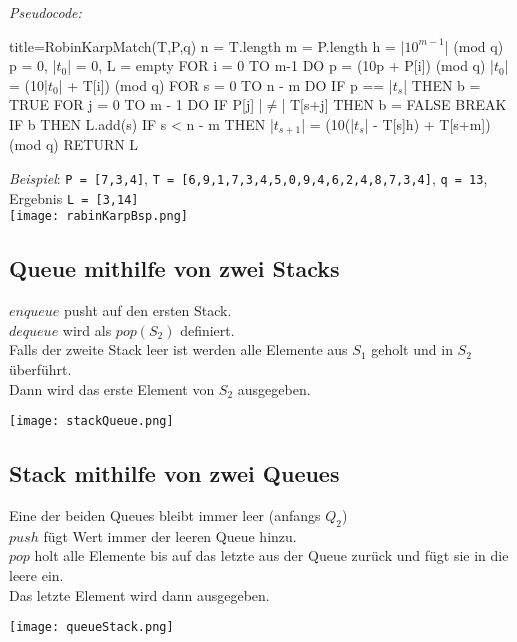             \textit{Pseudocode:}
            \begin{ccode}[autogobble,escapeinside=||]{title={RobinKarpMatch(T,P,q)}}
            n = T.length
            m = P.length
            h = |$10^{m-1}$| (mod q)
            p = 0, |$t_0$| = 0, L = empty
            FOR i = 0 TO m-1 DO
                p = (10p + P[i]) (mod q)
                |$t_0$| = (10|$t_0$| + T[i]) (mod q)
            FOR s = 0 TO n - m DO
                IF p == |$t_s$| THEN
                    b = TRUE
                    FOR j = 0 TO m - 1 DO
                        IF P[j] |$\neq$| T[s+j] THEN
                            b = FALSE
                            BREAK
                    IF b THEN
                        L.add(s)
                IF s < n - m THEN
                |$t_{s+1}$| = (10(|$t_s$| - T[s]h) + T[s+m]) (mod q)
            RETURN L
            \end{ccode}

            \noindent
            \textit{Beispiel}: \texttt{P = [7,3,4]}, \texttt{T = [6,9,1,7,3,4,5,0,9,4,6,2,4,8,7,3,4]}, \texttt{q = 13}, Ergebnis \texttt{L = [3,14]} \\
            \texttt{[image: rabinKarpBsp.png]}




    \subsection{Queue mithilfe von zwei Stacks}

        $enqueue$ pusht auf den ersten Stack. \\
        $dequeue$ wird als $pop(S_2)$ definiert. \\
        Falls der zweite Stack leer ist werden alle Elemente aus $S_1$ geholt und in $S_2$ überführt. \\
        Dann wird das erste Element von $S_2$ ausgegeben. \\
        \centerline{\texttt{[image: stackQueue.png]}}
\pagebreak
    \subsection{Stack mithilfe von zwei Queues}

        Eine der beiden Queues bleibt immer leer (anfangs $Q_2$) \\
        $push$ fügt Wert immer der leeren Queue hinzu. \\
        $pop$ holt alle Elemente bis auf das letzte aus der Queue zurück und fügt sie in die leere ein. \\
        Das letzte Element wird dann ausgegeben. \\
        \centerline{\texttt{[image: queueStack.png]}}

